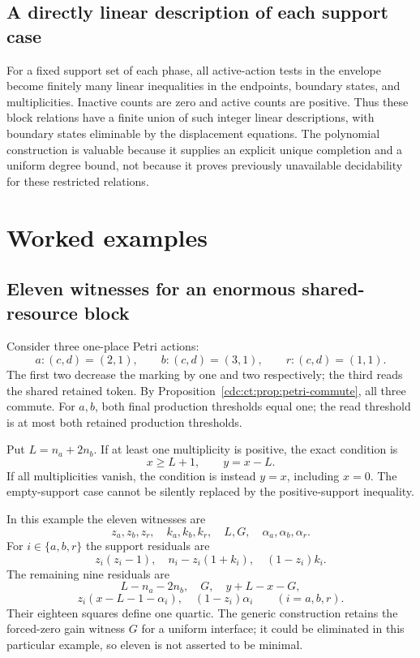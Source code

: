 \documentclass[11pt,a4paper]{article}
\theoremstyle{definition}
\theoremstyle{remark}
\newcommand{\srctag}[1]{\texorpdfstring{\hspace{0.5em}{\normalfont\small\color{accent}[#1]}}{ [#1]}}
\begin{document}
\subsection{A directly linear description of each support case}
For a fixed support set of each phase, all active-action tests in the envelope become finitely many linear inequalities in the endpoints, boundary states, and multiplicities. Inactive counts are zero and active counts are positive. Thus these block relations have a finite union of such integer linear descriptions, with boundary states eliminable by the displacement equations. The polynomial construction is valuable because it supplies an explicit unique completion and a uniform degree bound, not because it proves previously unavailable decidability for these restricted relations.


\section{Worked examples\srctag{01}}\label{cdc:ct:sec:examples}
\subsection{Eleven witnesses for an enormous shared-resource block}
Consider three one-place Petri actions:
\begin{equation}\label{cdc:ct:eq:example-actions}
 a:(c,d)=(2,1),\qquad b:(c,d)=(3,1),\qquad r:(c,d)=(1,1).
\end{equation}
The first two decrease the marking by one and two respectively; the third reads the shared retained token. By Proposition~\ref{cdc:ct:prop:petri-commute}, all three commute. For $a,b$, both final production thresholds equal one; the read threshold is at most both retained production thresholds.

Put $L=n_a+2n_b$. If at least one multiplicity is positive, the exact condition is
\begin{equation}\label{cdc:ct:eq:example-condition}
 x\ge L+1,\qquad y=x-L.
\end{equation}
If all multiplicities vanish, the condition is instead $y=x$, including $x=0$. The empty-support case cannot be silently replaced by the positive-support inequality.

In this example the eleven witnesses are
\[
 z_a,z_b,z_r,\quad k_a,k_b,k_r,\quad L,G,\quad\alpha_a,\alpha_b,\alpha_r.
\]
For $i\in\{a,b,r\}$ the support residuals are
\[
 z_i(z_i-1),\quad n_i-z_i(1+k_i),\quad(1-z_i)k_i.
\]
The remaining nine residuals are
\[
 L-n_a-2n_b,\quad G,\quad y+L-x-G,
\]
\[
 z_i(x-L-1-\alpha_i),\quad(1-z_i)\alpha_i
       \qquad(i=a,b,r).
\]
Their eighteen squares define one quartic. The generic construction retains the forced-zero gain witness $G$ for a uniform interface; it could be eliminated in this particular example, so eleven is not asserted to be minimal.
\end{document}
